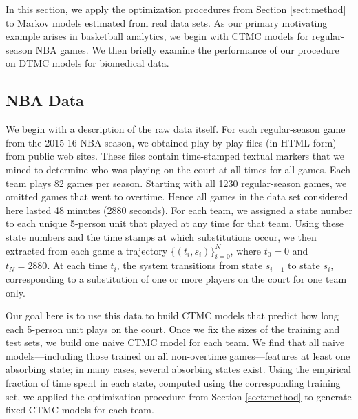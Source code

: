 \documentclass[review,letterpaper,11pt]{elsarticle}
\begin{document}
In this section, we apply the optimization procedures from Section \ref{sect:method} to Markov models estimated from real data sets.  As our primary motivating example arises in basketball analytics, we begin with CTMC models for regular-season NBA games.  We then briefly examine the performance of our procedure on DTMC models for biomedical data.


\subsection{NBA Data}
\label{sect:nbadata}
We begin with a description of the raw data itself.  For each regular-season game from the 2015-16 NBA season, we obtained play-by-play files (in HTML form) from public web sites.  These files contain time-stamped textual markers that we mined to determine who was playing on the court at all times for all games.  Each team plays 82 games per season.  Starting with all 1230 regular-season games, we omitted games that went to overtime.  Hence all games in the data set considered here lasted 48 minutes (2880 seconds).  For each team, we assigned a state number to each unique 5-person unit that played at any time for that team.  Using these state numbers and the time stamps at which substitutions occur, we then extracted from each game a trajectory $\{(t_i, s_i)\}_{i=0}^{N}$, where $t_0 = 0$ and $t_N = 2880$.  At each time $t_i$, the system transitions from state $s_{i-1}$ to state $s_i$, corresponding to a substitution of one or more players on the court for one team only.  

Our goal here is to use this data to build CTMC models that predict how long each 5-person unit plays on the court.  Once we fix the sizes of the training and test sets, we build one naive CTMC model for each team.  We find that all naive models---including those trained on all non-overtime games---features at least one absorbing state; in many cases, several absorbing states exist.  Using the empirical fraction of time spent in each state, computed using the corresponding training set, we applied the optimization procedure from Section \ref{sect:method} to generate fixed CTMC models for each team.
\end{document}
